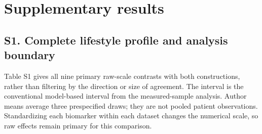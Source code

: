 \documentclass[sigconf,anonymous,nonacm]{acmart}
\begin{document}
\endgroup

\clearpage

\onecolumn

\raggedbottom

\appendix

\section*{Supplementary results}

\setcounter{figure}{0}

\renewcommand{\theHfigure}{S\arabic{figure}}

\renewcommand{\thefigure}{S\arabic{figure}}

\setcounter{table}{0}

\renewcommand{\theHtable}{S\arabic{table}}

\renewcommand{\thetable}{S\arabic{table}}


\subsection*{S1. Complete lifestyle profile and analysis boundary}

Table S1 gives all nine primary raw-scale contrasts with both constructions, rather than filtering by the direction or size of agreement. The interval is the conventional model-based interval from the measured-sample analysis. Author means average three prespecified draws; they are not pooled patient observations. Standardizing each biomarker within each dataset changes the numerical scale, so raw effects remain primary for this comparison.
\end{document}
